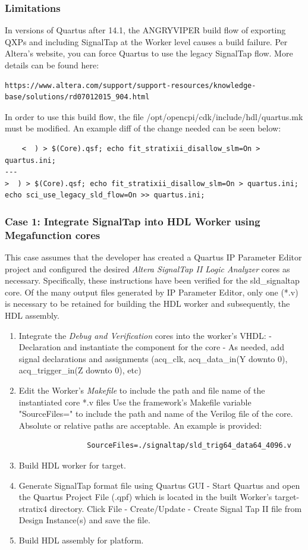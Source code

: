 \begin{flushleft}
	\subsubsection{Limitations}
	In versions of Quartus after 14.1, the ANGRYVIPER build flow of exporting QXPs and including SignalTap at the Worker level causes a build failure. Per Altera's website, you can force Quartus to use the legacy SignalTap flow. More details can be found here: \begin{verbatim}https://www.altera.com/support/support-resources/knowledge-base/solutions/rd07012015_904.html\end{verbatim}
	In order to use this build flow, the file /opt/opencpi/cdk/include/hdl/quartus.mk must be modified. An example diff of the change needed can be seen below:
	\scriptsize\begin{verbatim}
	<  ) > $(Core).qsf; echo fit_stratixii_disallow_slm=On > quartus.ini;
---
>  ) > $(Core).qsf; echo fit_stratixii_disallow_slm=On > quartus.ini; echo sci_use_legacy_sld_flow=On >> quartus.ini;
	\end{verbatim}\normalsize
	\subsubsection{Case 1: Integrate SignalTap into HDL Worker using Megafunction cores}
	This case assumes that the developer has created a Quartus IP Parameter Editor project and configured the desired \textit{Altera SignalTap II Logic Analyzer} cores as necessary. Specifically, these instructions have been verified for the sld\_signaltap core. Of the many output files generated by IP Parameter Editor, only one (*.v) is necessary to be retained for building the HDL worker and subsequently, the HDL assembly.
		\begin{enumerate}
			\item Integrate the \textit{Debug and Verification} cores into the worker's VHDL:
				\subitem - Declaration and instantiate the component for the core
				\subitem - As needed, add signal declarations and assignments (acq\_clk, acq\_data\_in(Y downto 0), acq\_trigger\_in(Z downto 0), etc)
			\item Edit the Worker's \textit{Makefile} to include the path and file name of the instantiated core *.v files Use the framework's Makefile variable "SourceFiles=" to include the path and	name of the Verilog file of the core. Absolute or relative paths are acceptable. An example is provided:
			\small\begin{verbatim}
				SourceFiles=./signaltap/sld_trig64_data64_4096.v
			\end{verbatim}
		 	\item Build HDL worker for target.
		 	\item Generate SignalTap format file using Quartus GUI
		 		\subitem - Start Quartus and open the Quartus Project File (.qpf) which is located in the built Worker's target-stratix4 directory. Click File - Create/Update - Create Signal Tap II file from Design Instance(s) and save the file.
			\item Build HDL assembly for platform.
		\end{enumerate}


\end{flushleft}
